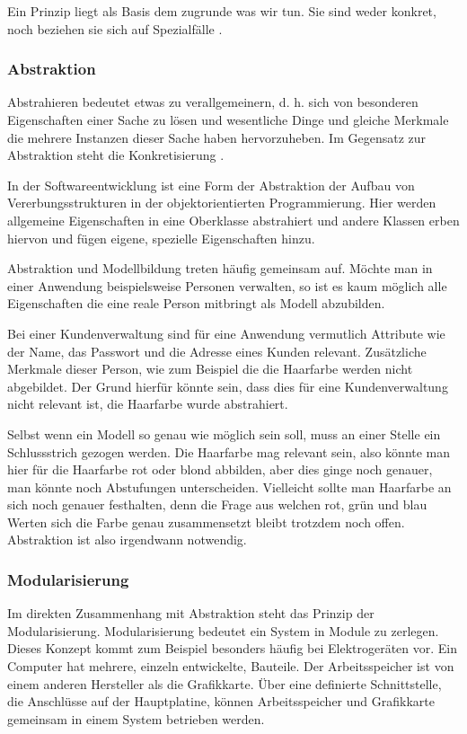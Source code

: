 \documentclass[12pt,oneside,a4paper,parskip]{scrbook}
\begin{document}
Ein Prinzip liegt als Basis dem zugrunde was wir tun. Sie sind weder konkret, noch beziehen sie sich auf Spezialfälle \cite[S. 25]{balzert2009a}. 

\subsubsection{Abstraktion}

Abstrahieren bedeutet etwas zu verallgemeinern, d. h. sich von besonderen Eigenschaften einer Sache zu lösen und wesentliche Dinge und gleiche Merkmale die mehrere Instanzen dieser Sache haben hervorzuheben. Im Gegensatz zur Abstraktion steht die Konkretisierung \cite[S. 26]{balzert2009a}.

In der Softwareentwicklung ist eine Form der Abstraktion der Aufbau von Vererbungsstrukturen in der objektorientierten Programmierung. Hier werden allgemeine Eigenschaften in eine Oberklasse abstrahiert und andere Klassen erben hiervon und fügen eigene, spezielle Eigenschaften hinzu.

Abstraktion und Modellbildung treten häufig gemeinsam auf. Möchte man in einer Anwendung beispielsweise Personen verwalten, so ist es kaum möglich alle Eigenschaften die eine reale Person mitbringt als Modell abzubilden. 

Bei einer Kundenverwaltung sind für eine Anwendung vermutlich Attribute wie der Name, das Passwort und die Adresse eines Kunden relevant. Zusätzliche Merkmale dieser Person, wie zum Beispiel die die Haarfarbe werden nicht abgebildet. Der Grund hierfür könnte sein, dass dies für eine Kundenverwaltung nicht relevant ist, die Haarfarbe wurde abstrahiert.

Selbst wenn ein Modell so genau wie möglich sein soll, muss an einer Stelle ein Schlussstrich gezogen werden. Die Haarfarbe mag relevant sein, also könnte man hier für die Haarfarbe rot oder blond abbilden, aber dies ginge noch genauer, man könnte noch Abstufungen unterscheiden. Vielleicht sollte man Haarfarbe an sich noch genauer festhalten, denn die Frage aus welchen rot, grün und blau Werten sich die Farbe genau zusammensetzt bleibt trotzdem noch offen. Abstraktion ist also irgendwann notwendig.

\subsubsection{Modularisierung}

Im direkten Zusammenhang mit Abstraktion steht das Prinzip der Modularisierung. Modularisierung bedeutet ein System in Module zu zerlegen. Dieses Konzept kommt zum Beispiel besonders häufig bei Elektrogeräten vor. Ein Computer hat mehrere, einzeln entwickelte, Bauteile. Der Arbeitsspeicher ist von einem anderen Hersteller als die Grafikkarte. Über eine definierte Schnittstelle, die Anschlüsse auf der Hauptplatine, können Arbeitsspeicher und Grafikkarte gemeinsam in einem System betrieben werden.
\end{document}
